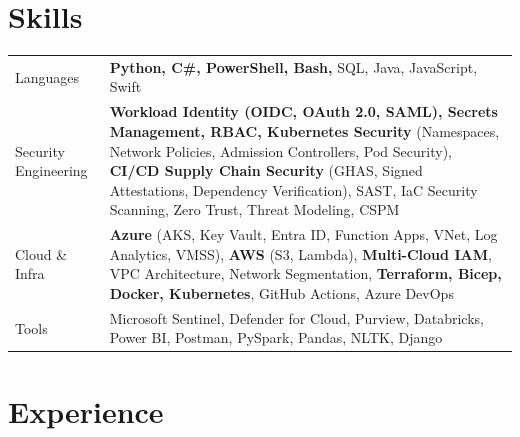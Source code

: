 \documentclass[a4paper,3pt]{article}
\begin{document}
\section{Skills}
\begin{tabularx}{\linewidth}{@{}l X@{}}
    Languages           & \normalsize{\textbf{Python, C\#, PowerShell, Bash,} SQL, Java, JavaScript, Swift}\\
    Security Engineering & \normalsize{\textbf{Workload Identity (OIDC, OAuth 2.0, SAML), Secrets Management, RBAC, Kubernetes Security} (Namespaces, Network Policies, Admission Controllers, Pod Security), \textbf{CI/CD Supply Chain Security} (GHAS, Signed Attestations, Dependency Verification), SAST, IaC Security Scanning, Zero Trust, Threat Modeling, CSPM}\\
    Cloud \& Infra      & \normalsize{\textbf{Azure} (AKS, Key Vault, Entra ID, Function Apps, VNet, Log Analytics, VMSS), \textbf{AWS} (S3, Lambda), \textbf{Multi-Cloud IAM}, VPC Architecture, Network Segmentation, \textbf{Terraform, Bicep, Docker, Kubernetes}, GitHub Actions, Azure DevOps}\\
    Tools               & \normalsize{Microsoft Sentinel, Defender for Cloud, Purview, Databricks, Power BI, Postman, PySpark, Pandas, NLTK, Django}
\end{tabularx}


\section{Experience}
\end{document}
